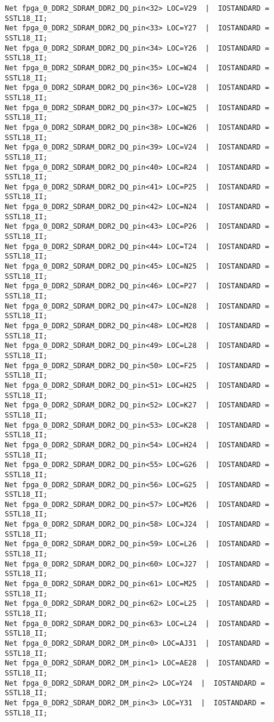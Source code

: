 \begin{verbatim}
Net fpga_0_DDR2_SDRAM_DDR2_DQ_pin<32> LOC=V29  |  IOSTANDARD = SSTL18_II;
Net fpga_0_DDR2_SDRAM_DDR2_DQ_pin<33> LOC=Y27  |  IOSTANDARD = SSTL18_II;
Net fpga_0_DDR2_SDRAM_DDR2_DQ_pin<34> LOC=Y26  |  IOSTANDARD = SSTL18_II;
Net fpga_0_DDR2_SDRAM_DDR2_DQ_pin<35> LOC=W24  |  IOSTANDARD = SSTL18_II;
Net fpga_0_DDR2_SDRAM_DDR2_DQ_pin<36> LOC=V28  |  IOSTANDARD = SSTL18_II;
Net fpga_0_DDR2_SDRAM_DDR2_DQ_pin<37> LOC=W25  |  IOSTANDARD = SSTL18_II;
Net fpga_0_DDR2_SDRAM_DDR2_DQ_pin<38> LOC=W26  |  IOSTANDARD = SSTL18_II;
Net fpga_0_DDR2_SDRAM_DDR2_DQ_pin<39> LOC=V24  |  IOSTANDARD = SSTL18_II;
Net fpga_0_DDR2_SDRAM_DDR2_DQ_pin<40> LOC=R24  |  IOSTANDARD = SSTL18_II;
Net fpga_0_DDR2_SDRAM_DDR2_DQ_pin<41> LOC=P25  |  IOSTANDARD = SSTL18_II;
Net fpga_0_DDR2_SDRAM_DDR2_DQ_pin<42> LOC=N24  |  IOSTANDARD = SSTL18_II;
Net fpga_0_DDR2_SDRAM_DDR2_DQ_pin<43> LOC=P26  |  IOSTANDARD = SSTL18_II;
Net fpga_0_DDR2_SDRAM_DDR2_DQ_pin<44> LOC=T24  |  IOSTANDARD = SSTL18_II;
Net fpga_0_DDR2_SDRAM_DDR2_DQ_pin<45> LOC=N25  |  IOSTANDARD = SSTL18_II;
Net fpga_0_DDR2_SDRAM_DDR2_DQ_pin<46> LOC=P27  |  IOSTANDARD = SSTL18_II;
Net fpga_0_DDR2_SDRAM_DDR2_DQ_pin<47> LOC=N28  |  IOSTANDARD = SSTL18_II;
Net fpga_0_DDR2_SDRAM_DDR2_DQ_pin<48> LOC=M28  |  IOSTANDARD = SSTL18_II;
Net fpga_0_DDR2_SDRAM_DDR2_DQ_pin<49> LOC=L28  |  IOSTANDARD = SSTL18_II;
Net fpga_0_DDR2_SDRAM_DDR2_DQ_pin<50> LOC=F25  |  IOSTANDARD = SSTL18_II;
Net fpga_0_DDR2_SDRAM_DDR2_DQ_pin<51> LOC=H25  |  IOSTANDARD = SSTL18_II;
Net fpga_0_DDR2_SDRAM_DDR2_DQ_pin<52> LOC=K27  |  IOSTANDARD = SSTL18_II;
Net fpga_0_DDR2_SDRAM_DDR2_DQ_pin<53> LOC=K28  |  IOSTANDARD = SSTL18_II;
Net fpga_0_DDR2_SDRAM_DDR2_DQ_pin<54> LOC=H24  |  IOSTANDARD = SSTL18_II;
Net fpga_0_DDR2_SDRAM_DDR2_DQ_pin<55> LOC=G26  |  IOSTANDARD = SSTL18_II;
Net fpga_0_DDR2_SDRAM_DDR2_DQ_pin<56> LOC=G25  |  IOSTANDARD = SSTL18_II;
Net fpga_0_DDR2_SDRAM_DDR2_DQ_pin<57> LOC=M26  |  IOSTANDARD = SSTL18_II;
Net fpga_0_DDR2_SDRAM_DDR2_DQ_pin<58> LOC=J24  |  IOSTANDARD = SSTL18_II;
Net fpga_0_DDR2_SDRAM_DDR2_DQ_pin<59> LOC=L26  |  IOSTANDARD = SSTL18_II;
Net fpga_0_DDR2_SDRAM_DDR2_DQ_pin<60> LOC=J27  |  IOSTANDARD = SSTL18_II;
Net fpga_0_DDR2_SDRAM_DDR2_DQ_pin<61> LOC=M25  |  IOSTANDARD = SSTL18_II;
Net fpga_0_DDR2_SDRAM_DDR2_DQ_pin<62> LOC=L25  |  IOSTANDARD = SSTL18_II;
Net fpga_0_DDR2_SDRAM_DDR2_DQ_pin<63> LOC=L24  |  IOSTANDARD = SSTL18_II;
Net fpga_0_DDR2_SDRAM_DDR2_DM_pin<0> LOC=AJ31  |  IOSTANDARD = SSTL18_II;
Net fpga_0_DDR2_SDRAM_DDR2_DM_pin<1> LOC=AE28  |  IOSTANDARD = SSTL18_II;
Net fpga_0_DDR2_SDRAM_DDR2_DM_pin<2> LOC=Y24  |  IOSTANDARD = SSTL18_II;
Net fpga_0_DDR2_SDRAM_DDR2_DM_pin<3> LOC=Y31  |  IOSTANDARD = SSTL18_II;

\end{verbatim}
